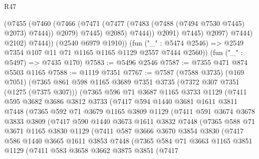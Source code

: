 \begin{lexlean}{R47}
\begin{coremodule}
                        (@7455
                          (@7460
                            (@7466
                              (@7471 (@7477 (@7483 (@7488 (@7494 @7530 @7445) @2073) @7444)) @2079)
                              @7445)
                            @2085)
                          @7444))
                      @2091)
                    @7445)
                  @2097)
                @7444)
              @2102)
            @7444))
        (@2540 @6979 @1910))
      (fun ("_" : @5474 @2546) => @2549 @7354 @107 @11 @71 @1165 @1165 @1129 @2557 @7444 @2560))
    (fun ("_" : @5497) => @7435 @170)
@7583 := @5496 @2546
@7587 := @7355 @471 @874 @5503 @1165
@7588 := @1119 @7351
@7767 := @7587
    (@7588 @3735)
    (@169 @7051)
    (@7365
      @861
      @598
      @1165
      @3689
      @7351
      @3735
      (@7372 @307 @7351 (@1275 (@7375 @307)))
      (@7365
        @596
        @71
        @3687
        @1165
        @3733
        @1129
        (@7411
          @595
          @3682
          @3686
          @3812
          @3733
          (@7417
            @594
            @1440
            @3681
            @1611
            @3811
            @7448
            (@7365
              @592
              @71
              @3679
              @1165
              @3809
              @1129
              (@7411
                @591
                @3674
                @3678
                @3833
                @3809
                (@7417
                  @590
                  @1440
                  @3673
                  @1611
                  @3832
                  @7448
                  (@7365
                    @588
                    @71
                    @3671
                    @1165
                    @3830
                    @1129
                    (@7411
                      @587
                      @3666
                      @3670
                      @3854
                      @3830
                      (@7417
                        @586
                        @1440
                        @3665
                        @1611
                        @3853
                        @7448
                        (@7365
                          @584
                          @71
                          @3663
                          @1165
                          @3851
                          @1129
                          (@7411
                            @583
                            @3658
                            @3662
                            @3875
                            @3851
                            (@7417

\end{coremodule}
\end{lexlean}
